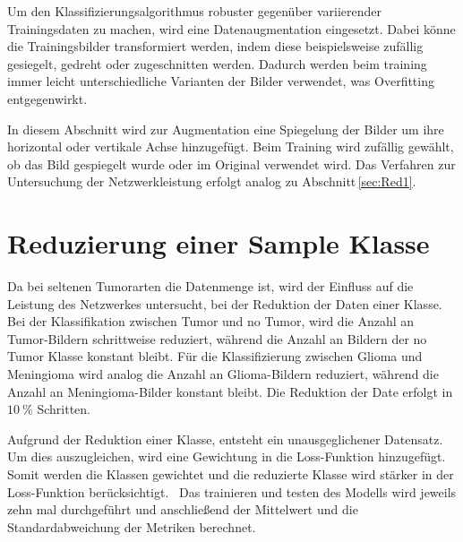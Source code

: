 Um den Klassifizierungsalgorithmus robuster gegenüber variierender Trainingsdaten zu machen, wird eine Datenaugmentation eingesetzt.
Dabei könne die Trainingsbilder transformiert werden, indem diese beispielsweise zufällig gesiegelt, gedreht oder zugeschnitten werden. 
Dadurch werden beim training immer leicht unterschiedliche Varianten der Bilder verwendet, was Overfitting entgegenwirkt.~\cite{Yamashita2018}

In diesem Abschnitt wird zur Augmentation eine Spiegelung der Bilder um ihre horizontal oder vertikale Achse hinzugefügt.
Beim Training wird zufällig gewählt, ob das Bild gespiegelt wurde oder im Original verwendet wird.
Das Verfahren zur Untersuchung der Netzwerkleistung erfolgt analog zu Abschnitt \ref{sec:Red1}.    

\section{Reduzierung einer Sample Klasse}

Da bei seltenen Tumorarten die Datenmenge ist, wird der Einfluss auf die Leistung des Netzwerkes untersucht, 
bei der Reduktion der Daten einer Klasse.
Bei der Klassifikation zwischen Tumor und no Tumor, wird die Anzahl an Tumor-Bildern schrittweise reduziert, 
während die Anzahl an Bildern der no Tumor Klasse konstant bleibt.
Für die Klassifizierung zwischen Glioma und Meningioma wird analog die Anzahl an Glioma-Bildern reduziert, während die Anzahl an Meningioma-Bilder konstant bleibt.
Die Reduktion der Date erfolgt in $\qty{10}{\%}$ Schritten. 

Aufgrund der Reduktion einer Klasse, entsteht ein unausgeglichener Datensatz.
Um dies auszugleichen, wird eine Gewichtung in die Loss-Funktion hinzugefügt.
Somit werden die Klassen gewichtet und die reduzierte Klasse wird stärker in der Loss-Funktion berücksichtigt.~\cite{pytorchCrossEntropy}
Das trainieren und testen des Modells wird jeweils zehn mal durchgeführt und anschließend der Mittelwert und die Standardabweichung der
Metriken berechnet.


